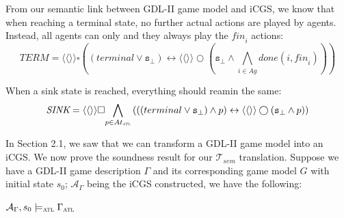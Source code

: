 \documentclass{article}
\theoremstyle{theorem}
\theoremstyle{lemma}
\theoremstyle{definition}
\theoremstyle{remark}
\begin{document}
\par From our semantic link between GDL-II game model and iCGS, we know that when reaching a terminal state, no further actual actions are played by agents. Instead, all agents can only and they always play the $\textit{fin}_i$ actions:
\[
    \textit{TERM} = \langle \langle \rangle \rangle \square \left((terminal \vee \texttt{s}_\bot) \leftrightarrow \langle \langle \rangle \rangle \bigcirc (\texttt{s}_\bot \wedge \underset{i \in Ag}{\bigwedge} done(i, \textit{fin}_i)) \right)
\]
\par When a sink state is reached, everything should reamin the same:
\[
    \textit{SINK} = \langle \langle \rangle \rangle \square \underset{p \in At_\textsc{atl}}{\bigwedge} \left(((terminal \vee \texttt{s}_\bot) \wedge p) \leftrightarrow \langle \langle \rangle \rangle \bigcirc (\texttt{s}_\bot \wedge p) \right)
\]
\par In Section 2.1, we saw that we can transform a GDL-II game model into an iCGS. We now prove the soundness result for our $\mathcal{T}_{sem}$ translation. Suppose we have a GDL-II game description $\Gamma$ and its corresponding game model $G$ with initial state $s_0$; $\mathcal{A}_\Gamma$ being the iCGS constructed, we have the following:
\begin{center}
    $\mathcal{A}_\Gamma, s_0 \models_\textsc{atl} \Gamma_\textsc{atl}$
\end{center}
\end{document}
